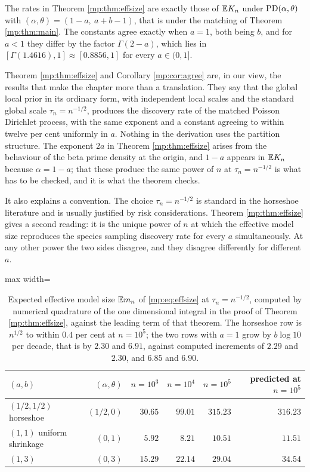 \begin{corollary}
\label{mp:cor:agree}
The rates in Theorem \ref{mp:thm:effsize} are exactly those of $\mathbb{E} K_n$ under
$\mathrm{PD}(\alpha,\theta)$ with $(\alpha,\theta)=(1-a,\ a+b-1)$, that is under the matching of
Theorem \ref{mp:thm:main}. The constants agree exactly when $a=1$, both being $b$, and for
$a<1$ they differ by the factor $\Gamma(2-a)$, which lies in
$[\Gamma(1.4616),1]\approx[0.8856,1]$ for every $a\in(0,1]$.
\end{corollary}

Theorem \ref{mp:thm:effsize} and Corollary \ref{mp:cor:agree} are, in our view, the results that
make the chapter more than a translation. They say that the global local prior in its ordinary
form, with independent local scales and the standard global scale $\tau_n=n^{-1/2}$, produces
the discovery rate of the matched Poisson Dirichlet process, with the same exponent and a
constant agreeing to within twelve per cent uniformly in $a$. Nothing in the derivation uses
the partition structure. The exponent $2a$ in Theorem \ref{mp:thm:effsize} arises from the
behaviour of the beta prime density at the origin, and $1-a$ appears in $\mathbb{E} K_n$ because
$\alpha=1-a$; that these produce the same power of $n$ at $\tau_n=n^{-1/2}$ is what has to
be checked, and it is what the theorem checks.

It also explains a convention. The choice $\tau_n=n^{-1/2}$ is standard in the horseshoe
literature and is usually justified by risk considerations. Theorem \ref{mp:thm:effsize} gives a
second reading: it is the unique power of $n$ at which the effective model size reproduces
the species sampling discovery rate for every $a$ simultaneously. At any other power the two
sides disagree, and they disagree differently for different $a$.

\begin{table}[t]
\centering
\begin{adjustbox}{max width=\textwidth}
\begin{tabular}{lrrrrr}
\toprule
$(a,b)$ & $(\alpha,\theta)$ & $n=10^3$ & $n=10^4$ & $n=10^5$ & predicted at $n=10^5$ \\
\midrule
$(1/2,1/2)$ horseshoe & $(1/2,0)$ & $30.65$ & $99.01$ & $315.23$ & $316.23$ \\
$(1,1)$ uniform shrinkage & $(0,1)$ & $5.92$ & $8.21$ & $10.51$ & $11.51$ \\
$(1,3)$ & $(0,3)$ & $15.29$ & $22.14$ & $29.04$ & $34.54$ \\
\bottomrule
\end{tabular}
\end{adjustbox}
\caption{Expected effective model size $\mathbb{E} m_n$ of \eqref{mp:eq:effsize} at
$\tau_n=n^{-1/2}$, computed by numerical quadrature of the one dimensional integral in the
proof of Theorem \ref{mp:thm:effsize}, against the leading term of that theorem. The horseshoe
row is $n^{1/2}$ to within $0.4$ per cent at $n=10^5$; the two rows with $a=1$ grow by
$b\log 10$ per decade, that is by $2.30$ and $6.91$, against computed increments of $2.29$
and $2.30$, and $6.85$ and $6.90$.}
\label{mp:tab:effsize}
\end{table}

